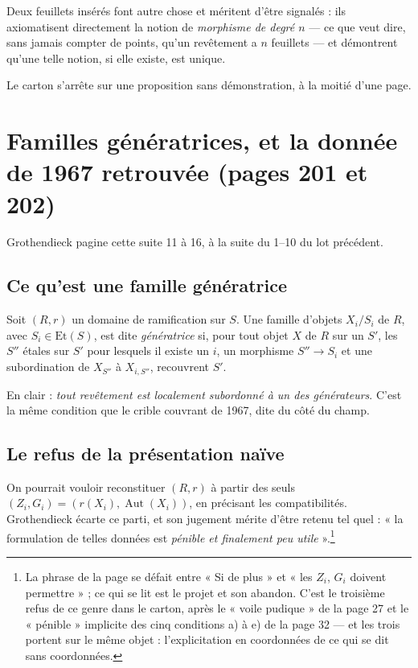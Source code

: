\documentclass[11pt,a4paper]{article}
\begin{document}
\begin{resume}
Deux feuillets insérés font autre chose et méritent d'être signalés : ils
axiomatisent directement la notion de \emph{morphisme de degré $n$} --- ce que
veut dire, sans jamais compter de points, qu'un revêtement a $n$ feuillets ---
et démontrent qu'une telle notion, si elle existe, est unique.

Le carton s'arrête sur une proposition sans démonstration, à la moitié d'une
page.

\end{resume}

\section*{Familles génératrices, et la donnée de 1967 retrouvée (pages 201 et 202)}

Grothendieck pagine cette suite 11 à 16, à la suite du 1--10 du lot précédent.

\subsection*{Ce qu'est une famille génératrice}

Soit $(R, r)$ un domaine de ramification sur $S$. Une famille d'objets
$X_{i}/S_{i}$ de $R$, avec $S_{i} \in \mathrm{Et}(S)$, est dite
\emph{génératrice} si, pour tout objet $X$ de $R$ sur un $S'$, les $S''$ étales
sur $S'$ pour lesquels il existe un $i$, un morphisme $S'' \to S_{i}$ et une
subordination de $X_{S''}$ à $X_{i,S''}$, recouvrent $S'$.

En clair : \emph{tout revêtement est localement subordonné à un des
générateurs}. C'est la même condition que le crible couvrant de 1967, dite du
côté du champ.

\subsection*{Le refus de la présentation naïve}

On pourrait vouloir reconstituer $(R, r)$ à partir des seuls
$(Z_{i}, G_{i}) = (r(X_{i}), \operatorname{Aut}(X_{i}))$, en précisant les
compatibilités. Grothendieck écarte ce parti, et son jugement mérite d'être
retenu tel quel : « la formulation de telles données est \emph{pénible et
finalement peu utile} ».\footnote{La phrase de la page se défait entre « Si de
plus » et « les $Z_{i}$, $G_{i}$ doivent permettre » ; ce qui se lit est le
projet et son abandon. C'est le troisième refus de ce genre dans le carton,
après le « voile pudique » de la page 27 et le « pénible » implicite des cinq
conditions a) à e) de la page 32 --- et les trois portent sur le même objet :
l'explicitation en coordonnées de ce qui se dit sans coordonnées.}
\end{document}
